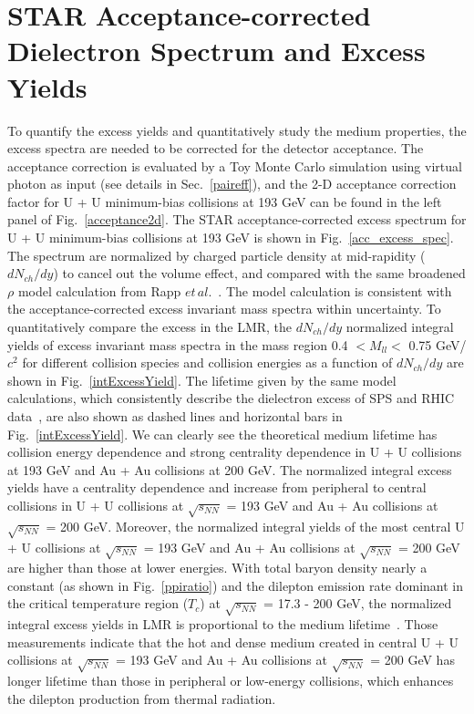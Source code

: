 \section{STAR Acceptance-corrected Dielectron Spectrum and Excess Yields}
To quantify the excess yields and quantitatively study the medium properties, the excess spectra are needed to be corrected for the detector acceptance. The acceptance correction is evaluated by a Toy Monte Carlo simulation using virtual photon as input (see details in Sec.~\ref{paireff}), and the 2-D acceptance correction factor for U + U minimum-bias collisions at 193 GeV can be found in the left panel of Fig.~\ref{acceptance2d}. The STAR acceptance-corrected excess spectrum for U + U minimum-bias collisions at 193 GeV is shown in Fig.~\ref{acc_excess_spec}. The spectrum are normalized by charged particle density at mid-rapidity ($dN_{ch}/dy$) to cancel out the volume effect, and compared with the same broadened $\rho$ model calculation from Rapp $et\,al.$~\cite{broaden1,broaden3,broaden4}. The model calculation is consistent with the acceptance-corrected excess invariant mass spectra within uncertainty. To quantitatively compare the excess in the LMR, the $dN_{ch}/dy$ normalized integral yields of excess invariant mass spectra in the mass region 0.4 $<M_{ll}<$ 0.75 GeV/$c^{2}$ for different collision species and collision energies as a function of $dN_{ch}/dy$ are shown in Fig.~\ref{intExcessYield}. The lifetime given by the same model calculations, which consistently describe the dielectron excess of SPS and RHIC data~\cite{CERES:dielectron3,NA60:dimuon0,PHENIX:dielectron1,STAR:dielectron1}, are also shown as dashed lines and horizontal bars in Fig.~\ref{intExcessYield}. We can clearly see the theoretical medium lifetime has collision energy dependence and strong centrality dependence in U + U collisions at 193 GeV and Au + Au collisions at 200 GeV. The normalized integral excess yields have a centrality dependence and increase from peripheral to central collisions in U + U collisions at $\sqrt{s_{NN}}$ = 193 GeV and Au + Au collisions at $\sqrt{s_{NN}}$ = 200 GeV. Moreover, the normalized integral yields of the most central U + U collisions at $\sqrt{s_{NN}}$ = 193 GeV and Au + Au collisions at $\sqrt{s_{NN}}$ = 200 GeV are higher than those at lower energies. With total baryon density nearly a constant (as shown in Fig.~\ref{ppiratio}) and the dilepton emission rate dominant in the critical temperature region ($T_{c}$) at $\sqrt{s_{NN}}$ = 17.3 - 200 GeV, the normalized integral excess yields in LMR is proportional to the medium lifetime~\cite{lifetime_cal}. Those measurements indicate that the hot and dense medium created in central U + U collisions at $\sqrt{s_{NN}}$ = 193 GeV and Au + Au collisions at $\sqrt{s_{NN}}$ = 200 GeV has longer lifetime than those in peripheral or low-energy collisions, which enhances the dilepton production from thermal radiation.

